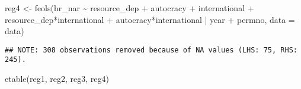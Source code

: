 \documentclass[
]{article}
\newenvironment{Shaded}{\begin{snugshade}}{\end{snugshade}}
\newcommand{\AttributeTok}[1]{\textcolor[rgb]{0.77,0.63,0.00}{#1}}
\newcommand{\FunctionTok}[1]{\textcolor[rgb]{0.00,0.00,0.00}{#1}}
\newcommand{\NormalTok}[1]{#1}
\newcommand{\OtherTok}[1]{\textcolor[rgb]{0.56,0.35,0.01}{#1}}
\newcommand{\SpecialCharTok}[1]{\textcolor[rgb]{0.00,0.00,0.00}{#1}}
\begin{document}
\begin{Shaded}
\begin{Highlighting}[]
\NormalTok{reg4 }\OtherTok{\textless{}{-}} \FunctionTok{feols}\NormalTok{(hr\_nar }\SpecialCharTok{\textasciitilde{}}\NormalTok{ resource\_dep }\SpecialCharTok{+}\NormalTok{ autocracy }\SpecialCharTok{+}\NormalTok{ international }
              \SpecialCharTok{+}\NormalTok{ resource\_dep}\SpecialCharTok{*}\NormalTok{international }\SpecialCharTok{+}\NormalTok{ autocracy}\SpecialCharTok{*}\NormalTok{international }\SpecialCharTok{|}\NormalTok{ year }\SpecialCharTok{+}\NormalTok{ permno, }
              \AttributeTok{data =}\NormalTok{ data)}
\end{Highlighting}
\end{Shaded}

\begin{verbatim}
## NOTE: 308 observations removed because of NA values (LHS: 75, RHS: 245).
\end{verbatim}

\begin{Shaded}
\begin{Highlighting}[]
\FunctionTok{etable}\NormalTok{(reg1, reg2, reg3, reg4)}
\end{Highlighting}
\end{Shaded}
\end{document}
